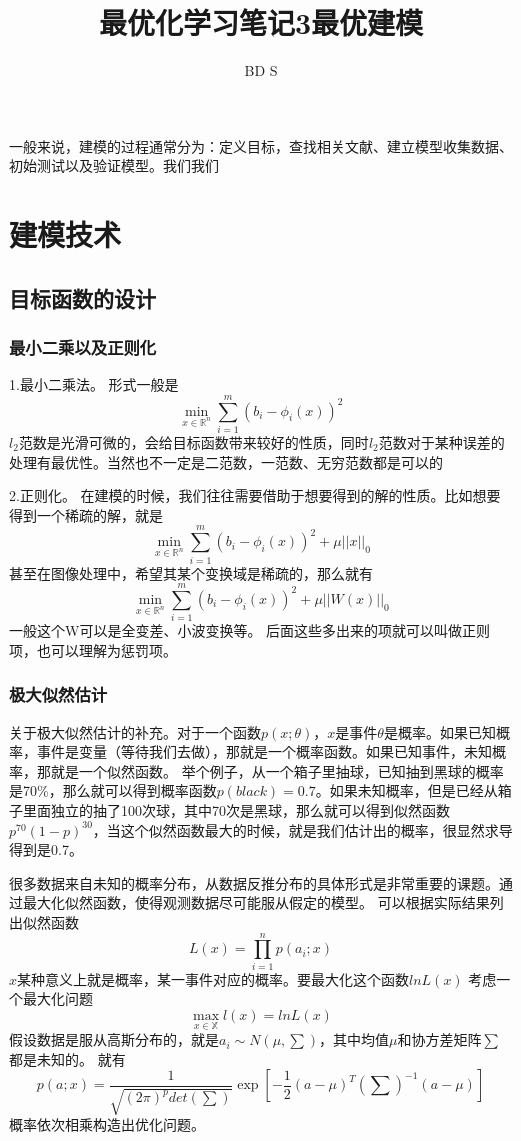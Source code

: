 \documentclass{article}
\title{最优化学习笔记3最优建模}
\author{BD S}
\begin{document}
\maketitle
\tableofcontents
\newpage
一般来说，建模的过程通常分为：定义目标，查找相关文献、建立模型收集数据、初始测试以及验证模型。我们我们
\section{建模技术}
\subsection{目标函数的设计}
\subsubsection{最小二乘以及正则化}
1.最小二乘法。
形式一般是
$$
\min\limits_{x \in \mathbb{R}^n} \sum\limits_{i=1}^m (b_i-\phi_i(x))^2
$$
$l_2$范数是光滑可微的，会给目标函数带来较好的性质，同时$l_2$范数对于某种误差的处理有最优性。当然也不一定是二范数，一范数、无穷范数都是可以的

2.正则化。
在建模的时候，我们往往需要借助于想要得到的解的性质。比如想要得到一个稀疏的解，就是
$$
\min\limits_{x \in \mathbb{R}^n} \sum\limits_{i=1}^m (b_i-\phi_i(x))^2+\mu||x||_0
$$
甚至在图像处理中，希望其某个变换域是稀疏的，那么就有
$$
\min\limits_{x \in \mathbb{R}^n} \sum\limits_{i=1}^m (b_i-\phi_i(x))^2+\mu||W(x)||_0
$$
一般这个W可以是全变差、小波变换等。
后面这些多出来的项就可以叫做正则项，也可以理解为惩罚项。
\subsubsection{极大似然估计}
关于极大似然估计的补充。对于一个函数$p(x;\theta)$，$x$是事件$\theta$是概率。如果已知概率，事件是变量（等待我们去做），那就是一个概率函数。如果已知事件，未知概率，那就是一个似然函数。
举个例子，从一个箱子里抽球，已知抽到黑球的概率是70\%，那么就可以得到概率函数$p(black)=0.7$。如果未知概率，但是已经从箱子里面独立的抽了100次球，其中70次是黑球，那么就可以得到似然函数$p^{70}(1-p)^{30}$，当这个似然函数最大的时候，就是我们估计出的概率，很显然求导得到是0.7。

很多数据来自未知的概率分布，从数据反推分布的具体形式是非常重要的课题。通过最大化似然函数，使得观测数据尽可能服从假定的模型。
可以根据实际结果列出似然函数
$$
L(x)=\prod_{i=1}^n p(a_i;x)
$$
$x$某种意义上就是概率，某一事件对应的概率。要最大化这个函数$lnL(x)$
考虑一个最大化问题
$$\max\limits_{x \in \mathbb{X}} l(x)=lnL(x)$$
假设数据是服从高斯分布的，就是$a_i\sim N(\mu,\sum)$，其中均值$\mu$和协方差矩阵$\sum$都是未知的。
就有$$
p(a;x)=\frac{1}{\sqrt{(2\pi)^p det(\sum)}}\exp[-\frac{1}{2}(a-\mu)^T(\sum)^{-1}(a-\mu)]
$$
概率依次相乘构造出优化问题。
\end{document}
